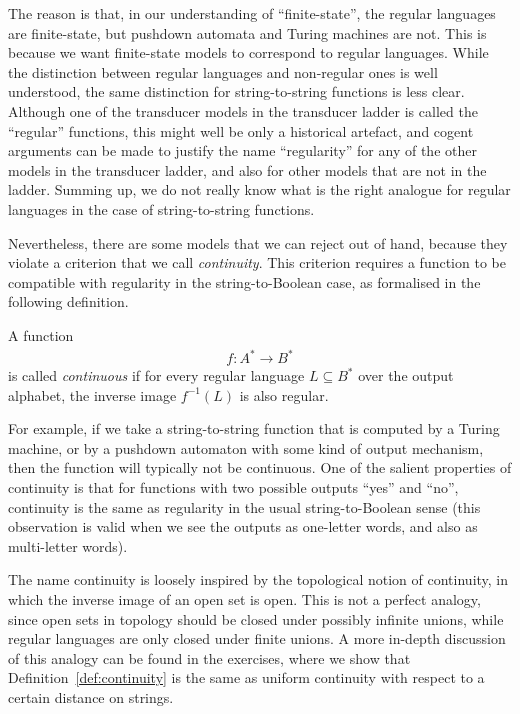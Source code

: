 The reason is that, in  our understanding of ``finite-state'', the  regular languages are finite-state, but pushdown automata and Turing machines are not.  This is because we want finite-state models to correspond to regular languages. While the distinction between regular languages and non-regular ones is well understood,  the same distinction for string-to-string functions is less clear.  Although one of the  transducer models in the transducer ladder is  called the ``regular'' functions, this might well be only  a historical artefact, and cogent arguments can be made to justify the name  ``regularity'' for any of  the other models in the transducer ladder, and also for other models that are not in the ladder. Summing up, we do not really know what is the right analogue for regular languages in the case of  string-to-string functions.

Nevertheless, there are some models that we can reject out of hand, because they violate a criterion that we call \emph{continuity}. This criterion requires a function to be compatible with regularity in the string-to-Boolean case, as formalised in the following definition. 
\begin{definition}
    \label{def:continuity}
    A  function 
    \begin{align*}
    f : A^* \to B^*
    \end{align*}
    is called \emph{continuous} if for every regular language $L \subseteq B^*$ over the output alphabet, the inverse image $f^{-1}(L)$ is also regular.
\end{definition}

For example, if we take a string-to-string  function that is  computed by a Turing machine, or by a pushdown automaton with some kind of output mechanism, then the function  will typically not be  continuous.  One of the salient properties of continuity is that for functions with two possible outputs ``yes'' and ``no'', continuity is the same as regularity in the usual string-to-Boolean sense (this observation is valid when we see the outputs as one-letter words, and also as multi-letter words).

The name continuity is loosely inspired by the topological notion of continuity, in which the inverse image of an open set is open. This is not a perfect analogy, since open sets in topology should be closed under possibly infinite unions, while regular languages are only closed under finite unions. A more in-depth discussion of this analogy can be found in the exercises, where we show that Definition~\ref{def:continuity} is the same as uniform continuity with respect to a certain distance on strings.

